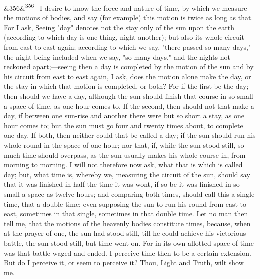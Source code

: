 \documentclass[12pt]{article}
\newcommand{\para}[1][]{\par\noindent\ifx&#1&\else\textsuperscript{\footnotesize #1}~\fi}
\begin{document}
\para[356] I desire to know the force and nature of time, by which we measure the motions of bodies, and say (for example) this motion is twice as long as that. For I ask, Seeing "day" denotes not the stay only of the sun upon the earth (according to which day is one thing, night another); but also its whole circuit from east to east again; according to which we say, "there passed so many days," the night being included when we say, "so many days," and the nights not reckoned apart;---seeing then a day is completed by the motion of the sun and by his circuit from east to east again, I ask, does the motion alone make the day, or the stay in which that motion is completed, or both? For if the first be the day; then should we have a day, although the sun should finish that course in so small a space of time, as one hour comes to. If the second, then should not that make a day, if between one sun-rise and another there were but so short a stay, as one hour comes to; but the sun must go four and twenty times about, to complete one day. If both, then neither could that be called a day; if the sun should run his whole round in the space of one hour; nor that, if, while the sun stood still, so much time should overpass, as the sun usually makes his whole course in, from morning to morning. I will not therefore now ask, what that is which is called day; but, what time is, whereby we, measuring the circuit of the sun, should say that it was finished in half the time it was wont, if so be it was finished in so small a space as twelve hours; and comparing both times, should call this a single time, that a double time; even supposing the sun to run his round from east to east, sometimes in that single, sometimes in that double time. Let no man then tell me, that the motions of the heavenly bodies constitute times, because, when at the prayer of one, the sun had stood still, till he could achieve his victorious battle, the sun stood still, but time went on. For in its own allotted space of time was that battle waged and ended. I perceive time then to be a certain extension. But do I perceive it, or seem to perceive it? Thou, Light and Truth, wilt show me.
\end{document}
